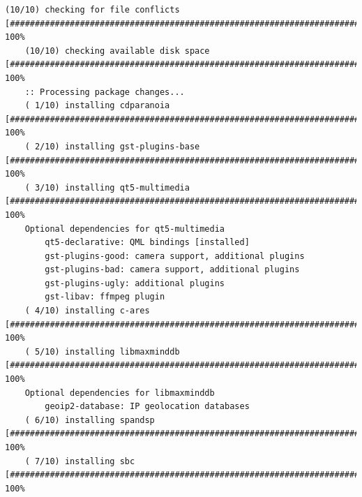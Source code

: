 \begin{Verbatim}[frame=single]
    (10/10) checking for file conflicts                                                                                                            [########################################################################################] 100%
    (10/10) checking available disk space                                                                                                          [########################################################################################] 100%
    :: Processing package changes...
    ( 1/10) installing cdparanoia                                                                                                                  [########################################################################################] 100%
    ( 2/10) installing gst-plugins-base                                                                                                            [########################################################################################] 100%
    ( 3/10) installing qt5-multimedia                                                                                                              [########################################################################################] 100%
    Optional dependencies for qt5-multimedia
        qt5-declarative: QML bindings [installed]
        gst-plugins-good: camera support, additional plugins
        gst-plugins-bad: camera support, additional plugins
        gst-plugins-ugly: additional plugins
        gst-libav: ffmpeg plugin
    ( 4/10) installing c-ares                                                                                                                      [########################################################################################] 100%
    ( 5/10) installing libmaxminddb                                                                                                                [########################################################################################] 100%
    Optional dependencies for libmaxminddb
        geoip2-database: IP geolocation databases
    ( 6/10) installing spandsp                                                                                                                     [########################################################################################] 100%
    ( 7/10) installing sbc                                                                                                                         [########################################################################################] 100%

\end{Verbatim}
